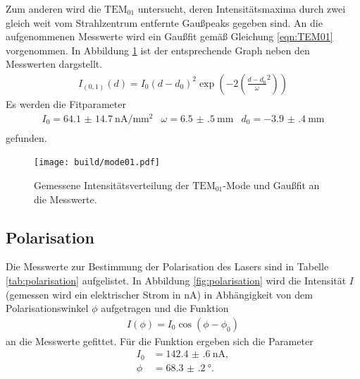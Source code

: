 Zum anderen wird die \textbf{$\text{TEM}_{01}$} untersucht, deren Intensitätsmaxima durch
zwei gleich weit vom Strahlzentrum entfernte Gaußpeaks gegeben sind.
An die aufgenommenen Messwerte wird ein Gaußfit gemäß Gleichung \ref{eqn:TEM01} vorgenommen.
In Abbildung \ref{fig:mode01} ist der entsprechende Graph neben den Messwerten dargstellt.
\begin{align}
  I_{(0,1)}(d) = I_{0} \left( d - d_{0} \right)^{2}
  \exp\left( -2 \left( \frac{d - d_{0}}{\omega}^2 \right) \right)\label{eqn:TEM01}
\end{align}
Es werden die Fitparameter
 \begin{align}
   I_{0} = \SI{64.1(147)}{\nano\ampere\per\milli\meter\squared} &\omega =\SI{6.5(5)}{\milli\meter}    &d_{0} = \SI{-3.9(4)}{\milli\meter}\\
 \end{align}
gefunden.
\begin{figure}
  \centering
  \texttt{[image: build/mode01.pdf]}
  \caption{Gemessene Intensitätsverteilung der \textbf{$\text{TEM}_{01}$}-Mode und Gaußfit an die Messwerte.}
  \label{fig:mode01}
\end{figure}



\subsection{Polarisation}
\label{subsec:Polarisation}
Die Messwerte zur Bestimmung der Polarisation des Lasers sind in Tabelle \ref{tab:polarisation} aufgelistet.
In Abbildung \ref{fig:polarisation} wird die Intensität $I$(gemessen wird ein elektrischer Strom in $\si{\nano\ampere}$)
in Abhängigkeit von dem Polarisationswinkel $\phi$
aufgetragen und die Funktion
\begin{align}
I(\phi)=I_0 \cos\left(\phi-\phi_0\right)
\end{align}
an die Messwerte gefittet.
Für die Funktion ergeben sich die Parameter
\begin{align}
I_0  & = \SI{142.4(6)}{\nano\ampere},\\
\phi & = \SI{68.3(2)}{\degree}.
\end{align}

